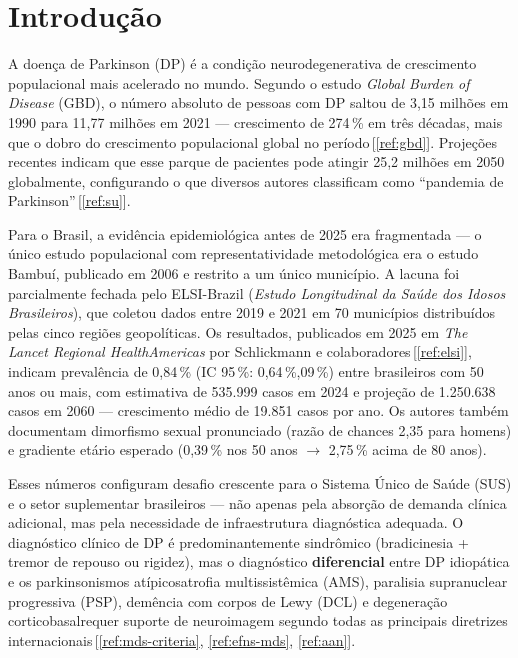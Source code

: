 \documentclass[12pt,a4paper,oneside]{article}
\begin{document}
\vspace{1cm}
\renewcommand{\listtablename}{Lista de Tabelas}
\listoftables

\newpage

\section{Introdução}\label{sec:intro}

A doença de Parkinson (DP) é a condição neurodegenerativa de
crescimento populacional mais acelerado no mundo. Segundo o estudo
\textit{Global Burden of Disease} (GBD), o número absoluto de
pessoas com DP saltou de 3,15 milhões em 1990 para 11,77 milhões em
2021 — crescimento de 274\,\% em três décadas, mais que o dobro do
crescimento populacional global no
período\,[\ref{ref:gbd}]. Projeções recentes indicam que esse parque
de pacientes pode atingir 25,2 milhões em 2050 globalmente,
configurando o que diversos autores classificam como
``pandemia de Parkinson''\,[\ref{ref:su}].

Para o Brasil, a evidência epidemiológica antes de 2025 era
fragmentada — o único estudo populacional com representatividade
metodológica era o estudo Bambuí, publicado em 2006 e restrito a um
único município. A lacuna foi parcialmente fechada pelo
ELSI-Brazil (\textit{Estudo Longitudinal da Saúde dos Idosos
Brasileiros}), que coletou dados entre 2019 e 2021 em 70
municípios distribuídos pelas cinco regiões geopolíticas. Os
resultados, publicados em 2025 em \textit{The Lancet Regional
Health\textendash Americas} por Schlickmann e
colaboradores\,[\ref{ref:elsi}], indicam prevalência de 0,84\,\%
(IC 95\,\%: 0,64\,\%,09\,\%) entre brasileiros com 50
anos ou mais, com estimativa de 535.999 casos em 2024 e projeção
de 1.250.638 casos em 2060 — crescimento médio de 19.851 casos por
ano. Os autores também documentam dimorfismo sexual pronunciado
(razão de chances 2,35 para homens) e gradiente etário esperado
(0,39\,\% nos 50 anos $\rightarrow$ 2,75\,\% acima de
80 anos).

Esses números configuram desafio crescente para o Sistema Único de
Saúde (SUS) e o setor suplementar brasileiros — não apenas pela
absorção de demanda clínica adicional, mas pela necessidade de
infraestrutura diagnóstica adequada. O diagnóstico clínico de DP é
predominantemente sindrômico (bradicinesia + tremor de repouso ou
rigidez), mas o diagnóstico \textbf{diferencial} entre DP idiopática
e os parkinsonismos atípicos\textemdash{}atrofia multissistêmica
(AMS), paralisia supranuclear progressiva (PSP), demência com corpos
de Lewy (DCL) e degeneração corticobasal\textemdash{}requer suporte
de neuroimagem segundo todas as principais diretrizes
internacionais\,[\ref{ref:mds-criteria}, \ref{ref:efns-mds},
\ref{ref:aan}].
\end{document}
